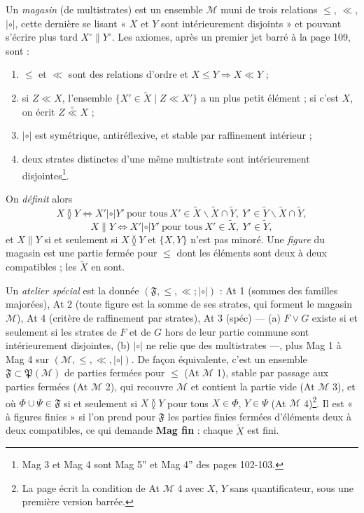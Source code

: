 \documentclass[11pt,a4paper]{article}
\begin{document}
Un \emph{magasin} (de multistrates) est un ensemble $\mathcal{M}$ muni de trois
relations $\leq$, $\ll$, $\mathrel{|{\circ}|}$, cette dernière se lisant « $X$ et
$Y$ sont intérieurement disjoints » et pouvant s'écrire plus tard $X^{\circ}
\parallel Y^{\circ}$. Les axiomes, après un premier jet barré à la page 109, sont :
\begin{enumerate}
\item[\textbf{Mag 1}] $\leq$ et $\ll$ sont des relations d'ordre et $X \leq Y
\Rightarrow X \ll Y$ ;
\item[\textbf{Mag 2}] si $Z \ll X$, l'ensemble $\{X' \in \widetilde{X} \mid Z \ll
X'\}$ a un plus petit élément ; si c'est $X$, on écrit $Z
\mathrel{\overset{\circ}{\ll}} X$ ;
\item[\textbf{Mag 3}] $\mathrel{|{\circ}|}$ est symétrique, antiréflexive, et stable
par raffinement intérieur ;
\item[\textbf{Mag 4}] deux strates distinctes d'une même multistrate sont
intérieurement disjointes\footnote{Mag 3 et Mag 4 sont Mag 5'' et Mag 4'' des pages
102-103.}.
\end{enumerate}
On \emph{définit} alors
\[
X \between Y \iff X' \mathrel{|{\circ}|} Y' \ \text{pour tous}\ X' \in \widetilde{X}
\smallsetminus \widetilde{X} \cap \widetilde{Y},\ Y' \in \widetilde{Y}
\smallsetminus \widetilde{X} \cap \widetilde{Y} ,
\]
\[
X \parallel Y \iff X' \mathrel{|{\circ}|} Y' \ \text{pour tous}\ X' \in
\widetilde{X},\ Y' \in \widetilde{Y} ,
\]
et $X \parallel Y$ si et seulement si $X \between Y$ et $\{X, Y\}$ n'est pas minoré.
Une \emph{figure} du magasin est une partie fermée pour $\leq$ dont les éléments
sont deux à deux compatibles ; les $\widetilde{X}$ en sont.

Un \emph{atelier spécial} est la donnée $(\mathfrak{F}, \leq, \ll ;
\mathrel{|{\circ}|})$ : At 1 (sommes des familles majorées), At 2 (toute figure est
la somme de ses strates, qui forment le magasin $\mathcal{M}$), At 4 (critère de
raffinement par strates), At 3 (spéc) --- (a) $F \vee G$ existe si et seulement si
les strates de $F$ et de $G$ hors de leur partie commune sont intérieurement
disjointes, (b) $\mathrel{|{\circ}|}$ ne relie que des multistrates ---, plus Mag 1
à Mag 4 sur $(\mathcal{M}, \leq, \ll, \mathrel{|{\circ}|})$. De façon équivalente,
c'est un ensemble $\mathfrak{F} \subset \mathfrak{P}(\mathcal{M})$ de parties
fermées pour $\leq$ (At $\mathcal{M}$ 1), stable par passage aux parties fermées
(At $\mathcal{M}$ 2), qui recouvre $\mathcal{M}$ et contient la partie vide (At
$\mathcal{M}$ 3), et où $\Phi \cup \Psi \in \mathfrak{F}$ si et seulement si $X
\between Y$ pour tous $X \in \Phi$, $Y \in \Psi$ (At $\mathcal{M}$ 4)\footnote{La
page écrit la condition de At $\mathcal{M}$ 4 avec $X$, $Y$ sans quantificateur,
sous une première version barrée.}. Il est « à figures finies » si l'on prend pour
$\mathfrak{F}$ les parties finies fermées d'éléments deux à deux compatibles, ce qui
demande \textbf{Mag fin} : chaque $\widetilde{X}$ est fini.
\end{document}
